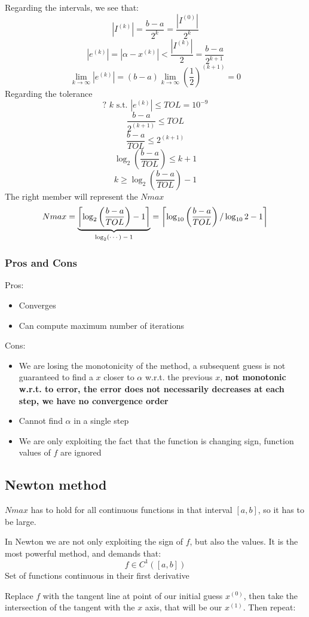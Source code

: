 Regarding the intervals, we see that:
$$
|I^{(k)}|=\frac{b-a}{2^k}=\frac{|I^{(0)}|}{2^k}
$$
$$
|e^{(k)}|=|\alpha-x^{(k)}|<\frac{|I^{(k)}|}{2}=\frac{b-a}{2^{k+1}}
$$
$$
\lim_{k\rightarrow\infty}|e^{(k)}|=(b-a)\lim_{k\rightarrow\infty}\left(\frac{1}{2}\right)^{(k+1)}=0
$$
Regarding the tolerance
$$
?\,\,k\text{ s.t. }|e^{(k)}|\leq TOL=10^{-9}
$$
$$
\frac{b-a}{2^{(k+1)}}\leq TOL
$$
$$
\frac{b-a}{TOL}\leq 2^{(k+1)}
$$
$$
\log_2\left(
    \frac{b-a}{TOL}
\right)\leq k+1
$$
$$
k\geq\log_2\left(
    \frac{b-a}{TOL}
\right)-1
$$
The right member will represent the $Nmax$
$$
Nmax=\underlabel{
    \left\lceil\log_2\left(
        \frac{b-a}{TOL}
    \right)-1\right\rceil
}{$\log_2(\cdots)-1$}=
\left\lceil\log_{10}\left(
    \frac{b-a}{TOL}
\right)/\log_{10}2-1\right\rceil
$$

\subsubsection{Pros and Cons}
Pros:
\begin{itemize}
    \item Converges
    \item Can compute maximum number of iterations
\end{itemize}
Cons:
\begin{itemize}
    \item We are losing the monotonicity of the method, a subsequent guess is not guaranteed to find a $x$ closer to $\alpha$ w.r.t. the previous $x$, \textbf{not monotonic w.r.t. to error, the error does not necessarily decreases at each step, we have no convergence order}
    \item Cannot find $\alpha$ in a single step
    \item We are only exploiting the fact that the function is changing sign, function values of $f$ are ignored
\end{itemize}

\subsection{Newton method}
$Nmax$ has to hold for all continuous functions in that interval $[a,b]$, so it has to be large.

In Newton we are not only exploiting the sign of $f$, but also the values. It is the most powerful method, and demands that:
$$f\in C^1([a,b])$$
Set of functions continuous in their first derivative

Replace $f$ with the tangent line at point of our initial guess $x^{(0)}$, then take the intersection of the tangent with the $x$ axis, that will be our $x^{(1)}$. Then repeat:

